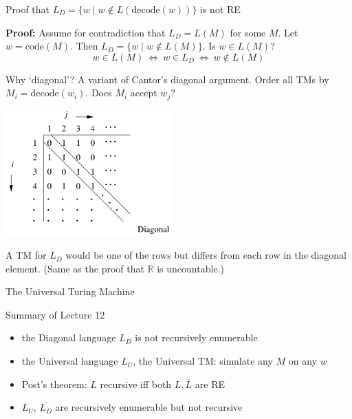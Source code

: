 \documentclass[handout]{beamer}
\begin{document}
\begin{frame}{Proof that $L_D=\{w\mid w\notin L(\mathrm{decode}(w))\}$ is not RE}

    \textbf{Proof:} Assume for contradiction that $L_D=L(M)$ for some $M$. Let $w=\mathrm{code}(M)$. Then $L_D=\{w\mid w\notin L(M)\}$. Is $w\in L(M)$?
    $$
    w\in L(M)\ \Leftrightarrow\ w\in L_D\ \Leftrightarrow\ w\notin L(M)
    $$
    
    \vspace{-24pt}
    \hfill\qedsymbol

    Why `diagonal'? A variant of Cantor's diagonal argument. Order all TMs by  $M_i=\mathrm{decode}(w_i)$. Does $M_i$ accept $w_j$?

    \vspace{-12pt}
    \begin{center}
        \includegraphics[width=0.48\textwidth]{files/diagonal.PNG}
    \end{center}
    \vspace{-15pt}
    A TM for $L_D$ would be one of the rows but differs from each row in the diagonal element. (Same as the proof that $\mathbb R$ is uncountable.)  
    
\end{frame}


\begin{frame}{The Universal Turing Machine}

    

\end{frame}



\begin{frame}{Summary of Lecture 12}

    \begin{itemize}
        \item the Diagonal language $L_D$ is not recursively enumerable
        \item the Universal language $L_U$, the Universal TM: simulate any $M$ on any $w$
        \item Post's theorem: $L$ recursive iff both $L,\overline{L}$ are RE
        \item $L_U$, $\overline{L_D}$ are recursively enumerable but not recursive
    \end{itemize}

\end{frame}
\end{document}

